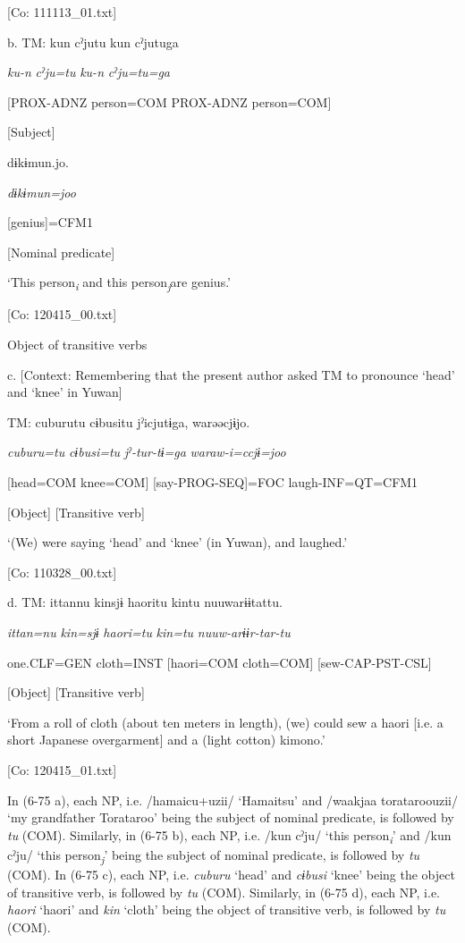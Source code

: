       [Co: 111113\_01.txt]

  b.  TM:  kun  cˀjutu  kun  cˀjutuga

      \textit{ku-n}  \textit{cˀju=tu}  \textit{ku-n}  \textit{cˀju=tu=ga}

      [PROX-ADNZ  person=COM  PROX-ADNZ  person=COM]

      [Subject]

      dɨkɨmun.jo.

      \textit{dɨkɨmun=joo}

      [genius]=CFM1

      [Nominal predicate]

      ‘This person\textit{\textsubscript{i}} and this person\textit{\textsubscript{j}}are genius.’

      [Co: 120415\_00.txt]

  Object of transitive verbs

  c.  [Context: Remembering that the present author asked TM to pronounce ‘head’ and ‘knee’ in Yuwan]

    TM:  cuburutu  cɨbusitu  jˀicjutɨga,  warəəcjɨjo.

      \textit{cuburu=tu}  \textit{cɨbusi=tu}  \textit{jˀ-tur-tɨ=ga}  \textit{waraw-i=ccjɨ=joo}

      [head=COM  knee=COM]  [say-PROG-SEQ]=FOC  laugh-INF=QT=CFM1

      [Object]  [Transitive verb]  

      ‘(We) were saying ‘head’ and ‘knee’ (in Yuwan), and laughed.’

      [Co: 110328\_00.txt]

  d.  TM:  ittannu  kinsjɨ  {\textbar}haori{\textbar}tu  kintu  nuuwarɨɨtattu.

      \textit{ittan=nu}  \textit{kin=sjɨ}  \textit{haori=tu}  \textit{kin=tu}  \textit{nuuw-arɨɨr-tar-tu}

      one.CLF=GEN  cloth=INST  [haori=COM  cloth=COM]  [sew-CAP-PST-CSL]

          [Object]  [Transitive verb]

      ‘From a roll of cloth (about ten meters in length), (we) could sew a haori [i.e. a short Japanese overgarment] and a (light cotton) kimono.’

      [Co: 120415\_01.txt]

In (6-75 a), each NP, i.e. /hamaicu+uzii/ ‘Hamaitsu’ and /waakjaa torataroouzii/ ‘my grandfather Torataroo’ being the subject of nominal predicate, is followed by \textit{tu} (COM). Similarly, in (6-75 b), each NP, i.e. /kun cˀju/ ‘this person\textit{\textsubscript{i}}’ and /kun cˀju/ ‘this person\textit{\textsubscript{j}}’ being the subject of nominal predicate, is followed by \textit{tu} (COM). In (6-75 c), each NP, i.e. \textit{cuburu} ‘head’ and \textit{cɨbusi} ‘knee’ being the object of transitive verb, is followed by \textit{tu} (COM). Similarly, in (6-75 d), each NP, i.e. \textit{haori} ‘haori’ and \textit{kin} ‘cloth’ being the object of transitive verb, is followed by \textit{tu} (COM).

